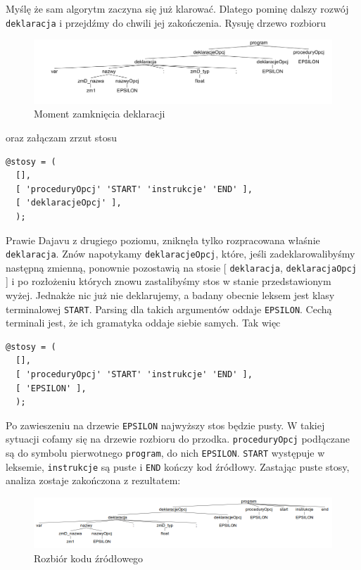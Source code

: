 \documentclass[a4paper,12pt]{article}
\begin{document}
Myślę że sam algorytm zaczyna się już klarować. Dlatego pominę dalszy rozwój \verb|deklaracja| i przejdźmy do chwili jej zakończenia. Rysuję drzewo rozbioru
\begin{figure}[htb] %
   \centering
   \includegraphics[scale=0.5,bb=0 0 1250 270]{grafika/prosteDrzewo/program_start.png}
   \caption{Moment zamknięcia deklaracji}
\end{figure}
\newpage
oraz załączam zrzut stosu
\begin{verbatim}
@stosy = (
  [],
  [ 'proceduryOpcj' 'START' 'instrukcje' 'END' ],
  [ 'deklaracjeOpcj' ],
  );
\end{verbatim}
Prawie Dajavu z drugiego poziomu, zniknęła tylko rozpracowana właśnie \verb|deklaracja|. Znów napotykamy \verb|deklaracjeOpcj|, które, jeśli zadeklarowalibyśmy następną zmienną, ponownie pozostawią na stosie [ \verb|deklaracja|, \verb|deklaracjaOpcj| ] i po rozłożeniu których znowu zastalibyśmy stos w stanie przedstawionym wyżej. Jednakże nic już nie deklarujemy, a badany obecnie leksem jest klasy terminalowej \verb|START|. Parsing dla takich argumentów oddaje \verb|EPSILON|. Cechą terminali jest, że ich gramatyka oddaje siebie samych. Tak więc
\begin{verbatim}
@stosy = (
  [],
  [ 'proceduryOpcj' 'START' 'instrukcje' 'END' ],
  [ 'EPSILON' ],
  );
\end{verbatim}
Po zawieszeniu na drzewie \verb|EPSILON| najwyższy stos będzie pusty. W takiej sytuacji cofamy się na drzewie rozbioru do przodka. \verb|proceduryOpcj| podłączane są do symbolu pierwotnego \verb|program|, do nich \verb|EPSILON|. \verb|START| występuje w leksemie, \verb|instrukcje| są puste i \verb|END| kończy kod źródłowy. Zastając puste stosy, analiza zostaje zakończona z rezultatem:
\begin{figure}[h!]
   \centering
   \includegraphics[scale=0.5,bb=0 0 1000 170]{grafika/prosteDrzewo/prosteDrzewoFinal.png}
   \caption{Rozbiór kodu źródłowego}
\end{figure}
\end{document}
